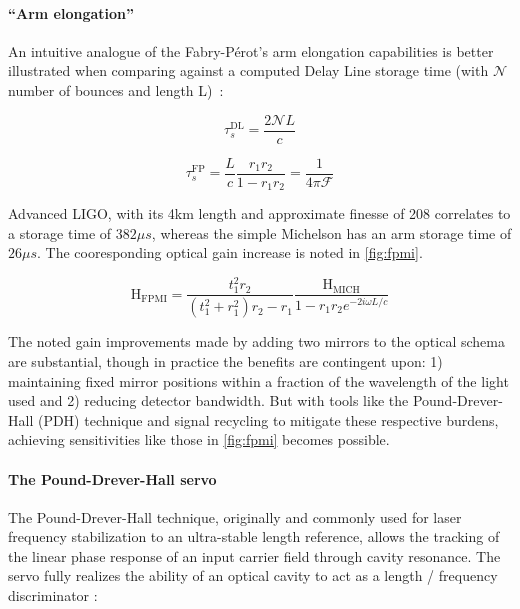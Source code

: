 \paragraph{``Arm elongation''}

An intuitive analogue of the Fabry-P\'{e}rot's arm elongation capabilities is better illustrated when comparing against a computed Delay Line storage time (with $\mathscr{N}$ number of bounces and length L)~\cite{saulson:2017}:

\begin{equation}
    \tau^\mathrm{DL}_s = \frac{2 \mathscr{N} L}{c}
\end{equation}

\begin{equation}
    \tau^\mathrm{FP}_s = \frac{L}{c} \frac{r_1r_2}{1-r_1r_2} = \frac{1}{4 \pi \mathscr{F}}
\end{equation}

Advanced LIGO, with its 4km length and approximate finesse of 208 correlates to a storage time of $382\mu s$, whereas the simple Michelson has an arm storage time of $26 \mu s$. The cooresponding optical gain increase is noted in \autoref{fig:fpmi}. 

\begin{equation}
	\mathrm{H_{FPMI}} = \frac{t_1 ^2 r_2}{(t_1^2 + r_1^2)r_2 - r_1} \frac{\mathrm{H_{MICH}}}{1 - r_1 r_2 e^{-2i \omega L / c}}
\end{equation}

The noted gain improvements made by adding two mirrors to the optical schema are substantial, though in practice the benefits are contingent upon: 1) maintaining fixed mirror positions within a fraction of the wavelength of the light used and 2) reducing detector bandwidth. But with tools like the Pound-Drever-Hall (PDH) technique and signal recycling to mitigate these respective burdens, achieving sensitivities like those in \autoref{fig:fpmi} becomes possible.

\paragraph{The Pound-Drever-Hall servo}
The Pound-Drever-Hall technique, originally and commonly used for laser frequency stabilization to an ultra-stable length reference, allows the tracking of the linear phase response of an input carrier field through cavity resonance. The servo fully realizes the ability of an optical cavity to act as a length / frequency discriminator \cite{pound_drever_hall:1983}:

